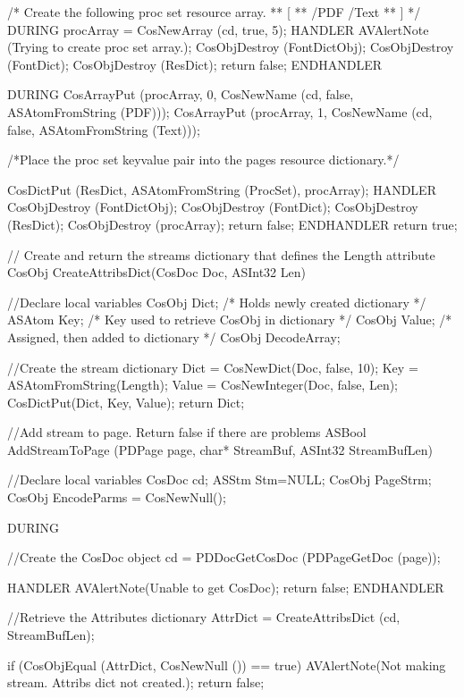 \documentclass[letterpaper,12pt,english,openany,oneside]{sphinxmanual}
\begin{document}
\begin{sphinxVerbatim}[commandchars=\\\{\}]
   /* Create the following proc set resource array.
   ** [
   ** /PDF /Text
   ** ]
   */
DURING
  procArray = CosNewArray (cd, true, 5);
HANDLER
  AVAlertNote  (\PYGZdq{}Trying to create proc set array.\PYGZdq{});
  CosObjDestroy (FontDictObj);
  CosObjDestroy (FontDict);
  CosObjDestroy (ResDict);
  return false;
END\PYGZus{}HANDLER

DURING
CosArrayPut (procArray, 0, CosNewName (cd, false, ASAtomFromString (\PYGZdq{}PDF\PYGZdq{})));
CosArrayPut (procArray, 1, CosNewName (cd, false, ASAtomFromString (\PYGZdq{}Text\PYGZdq{})));

/*Place the proc set key\PYGZhy{}value pair into the page\PYGZsq{}s resource dictionary.*/

CosDictPut (ResDict, ASAtomFromString (\PYGZdq{}ProcSet\PYGZdq{}), procArray);
HANDLER
  CosObjDestroy (FontDictObj);
  CosObjDestroy (FontDict);
  CosObjDestroy (ResDict);
  CosObjDestroy (procArray);
  return false;
END\PYGZus{}HANDLER
return true;
\PYGZcb{}

// Create and return the stream\PYGZsq{}s dictionary that defines the Length attribute
CosObj CreateAttribsDict(CosDoc Doc, ASInt32 Len)

\PYGZob{}
//Declare local variables
CosObj Dict; /* Holds newly created dictionary */
ASAtom Key; /* Key used to retrieve CosObj in dictionary */
CosObj Value; /* Assigned, then added to dictionary */
CosObj DecodeArray;

//Create the stream dictionary
Dict = CosNewDict(Doc, false, 10);
Key = ASAtomFromString(\PYGZdq{}Length\PYGZdq{});
Value = CosNewInteger(Doc, false, Len);
CosDictPut(Dict, Key, Value);
return Dict;
\PYGZcb{}

//Add stream to page. Return false if there are problems
ASBool AddStreamToPage (PDPage page, char* StreamBuf, ASInt32 StreamBufLen)

\PYGZob{}

//Declare local variables
CosDoc cd;
ASStm Stm=NULL;
CosObj PageStrm;
CosObj EncodeParms = CosNewNull();

DURING

//Create the CosDoc object
cd = PDDocGetCosDoc (PDPageGetDoc (page));

HANDLER
  AVAlertNote(\PYGZdq{}Unable to get CosDoc\PYGZdq{});
  return false;
END\PYGZus{}HANDLER


//Retrieve the Attributes dictionary
AttrDict = CreateAttribsDict (cd, StreamBufLen);

if (CosObjEqual (AttrDict, CosNewNull ()) == true)\PYGZob{}
  AVAlertNote(\PYGZdq{}Not making stream. Attribs dict not created.\PYGZdq{});
  return false;
\PYGZcb{}


\end{sphinxVerbatim}
\end{document}
